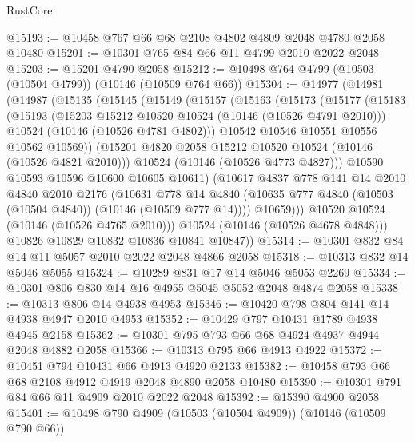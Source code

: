 \begin{lexlean}{RustCore}
\begin{coremodule}
@15193 := @10458 @767 @66 @68 @2108 @4802 @4809 @2048 @4780 @2058 @10480
@15201 := @10301 @765 @84 @66 @11 @4799 @2010 @2022 @2048
@15203 := @15201 @4790 @2058
@15212 := @10498 @764 @4799 (@10503 (@10504 @4799)) (@10146 (@10509 @764 @66))
@15304 := @14977
    (@14981
      (@14987
        (@15135
          (@15145
            (@15149
              (@15157
                (@15163
                  (@15173
                    (@15177
                      (@15183
                        (@15193
                          (@15203 @15212 @10520 @10524 (@10146 (@10526 @4791 @2010)))
                          @10524
                          (@10146 (@10526 @4781 @4802)))
                        @10542
                        @10546
                        @10551
                        @10556
                        @10562
                        @10569))
                    (@15201 @4820 @2058 @15212 @10520 @10524 (@10146 (@10526 @4821 @2010)))
                    @10524
                    (@10146 (@10526 @4773 @4827)))
                  @10590
                  @10593
                  @10596
                  @10600
                  @10605
                  @10611)
                (@10617
                  @4837
                  @778
                  @141
                  @14
                  @2010
                  @4840
                  @2010
                  @2176
                  (@10631
                    @778
                    @14
                    @4840
                    (@10635 @777 @4840 (@10503 (@10504 @4840)) (@10146 (@10509 @777 @14))))
                  @10659)))
            @10520
            @10524
            (@10146 (@10526 @4765 @2010)))
          @10524
          (@10146 (@10526 @4678 @4848)))
        @10826
        @10829
        @10832
        @10836
        @10841
        @10847))
@15314 := @10301 @832 @84 @14 @11 @5057 @2010 @2022 @2048 @4866 @2058
@15318 := @10313 @832 @14 @5046 @5055
@15324 := @10289 @831 @17 @14 @5046 @5053 @2269
@15334 := @10301 @806 @830 @14 @16 @4955 @5045 @5052 @2048 @4874 @2058
@15338 := @10313 @806 @14 @4938 @4953
@15346 := @10420 @798 @804 @141 @14 @4938 @4947 @2010 @4953
@15352 := @10429 @797 @10431 @1789 @4938 @4945 @2158
@15362 := @10301 @795 @793 @66 @68 @4924 @4937 @4944 @2048 @4882 @2058
@15366 := @10313 @795 @66 @4913 @4922
@15372 := @10451 @794 @10431 @66 @4913 @4920 @2133
@15382 := @10458 @793 @66 @68 @2108 @4912 @4919 @2048 @4890 @2058 @10480
@15390 := @10301 @791 @84 @66 @11 @4909 @2010 @2022 @2048
@15392 := @15390 @4900 @2058
@15401 := @10498 @790 @4909 (@10503 (@10504 @4909)) (@10146 (@10509 @790 @66))

\end{coremodule}
\end{lexlean}
